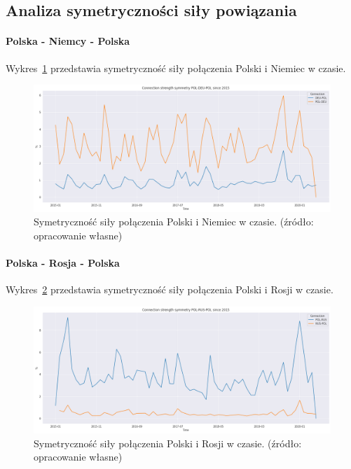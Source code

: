 \documentclass[11pt]{report}
\begin{document}
    \subsection{Analiza symetryczności siły powiązania}

    \paragraph{Polska - Niemcy - Polska}

    Wykres~\ref{fig:POL-DEU-POL} przedstawia symetryczność siły połączenia Polski i Niemiec w czasie.


    \begin{figure}[!htp]
        \centering
        \includegraphics[width=1 \textwidth]{fig/ConnectionSymmetry/POL-DEU-POL.png}
        \caption{Symetryczność siły połączenia Polski i Niemiec w czasie. (źródło: opracowanie własne)}
        \label{fig:POL-DEU-POL}
    \end{figure}

    \paragraph{Polska - Rosja - Polska}

    Wykres~\ref{fig:POL-RUS-POL} przedstawia symetryczność siły połączenia Polski i Rosji w czasie.


    \begin{figure}[!htp]
        \centering
        \includegraphics[width=1 \textwidth]{fig/ConnectionSymmetry/POL-RUS-POL.png}
        \caption{Symetryczność siły połączenia Polski i Rosji w czasie. (źródło: opracowanie własne)}
        \label{fig:POL-RUS-POL}
    \end{figure}
\end{document}
